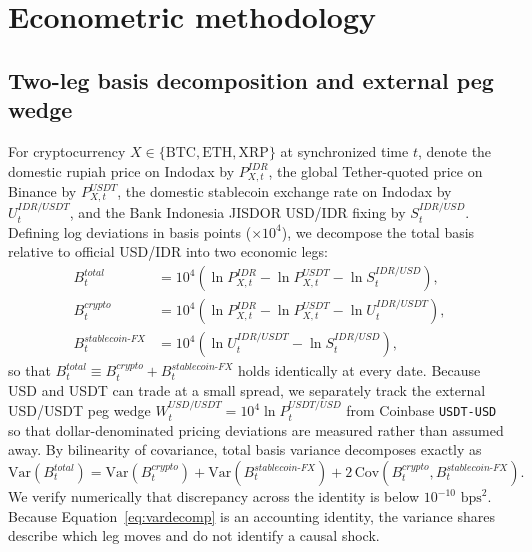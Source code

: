 \section{Econometric methodology}
\label{sec:method}

\subsection{Two-leg basis decomposition and external peg wedge}
For cryptocurrency $X \in \{\mathrm{BTC}, \mathrm{ETH}, \mathrm{XRP}\}$ at synchronized time $t$, denote the domestic rupiah price on Indodax by $P_{X,t}^{IDR}$, the global Tether-quoted price on Binance by $P_{X,t}^{USDT}$, the domestic stablecoin exchange rate on Indodax by $U_t^{IDR/USDT}$, and the Bank Indonesia JISDOR USD/IDR fixing by $S_t^{IDR/USD}$. Defining log deviations in basis points ($\times 10^4$), we decompose the total basis relative to official USD/IDR into two economic legs:
\begin{align}
  B_t^{total} &= 10^4 \left( \ln P_{X,t}^{IDR} - \ln P_{X,t}^{USDT} - \ln S_t^{IDR/USD} \right), \label{eq:btot} \\
  B_t^{crypto} &= 10^4 \left( \ln P_{X,t}^{IDR} - \ln P_{X,t}^{USDT} - \ln U_t^{IDR/USDT} \right), \label{eq:bcry} \\
  B_t^{stablecoin\text{-}FX} &= 10^4 \left( \ln U_t^{IDR/USDT} - \ln S_t^{IDR/USD} \right), \label{eq:bsf}
\end{align}
so that $B_t^{total} \equiv B_t^{crypto} + B_t^{stablecoin\text{-}FX}$ holds identically at every date. Because USD and USDT can trade at a small spread, we separately track the external USD/USDT peg wedge $W_t^{USD/USDT} = 10^4 \ln P_t^{USDT/USD}$ from Coinbase \texttt{USDT-USD} so that dollar-denominated pricing deviations are measured rather than assumed away. By bilinearity of covariance, total basis variance decomposes exactly as
\begin{equation}
  \mathrm{Var}(B_t^{total}) = \mathrm{Var}(B_t^{crypto}) + \mathrm{Var}(B_t^{stablecoin\text{-}FX}) + 2\,\mathrm{Cov}(B_t^{crypto}, B_t^{stablecoin\text{-}FX}).
  \label{eq:vardecomp}
\end{equation}
We verify numerically that discrepancy across the identity is below $10^{-10}\text{ bps}^2$. Because Equation~\eqref{eq:vardecomp} is an accounting identity, the variance shares describe which leg moves and do not identify a causal shock.

